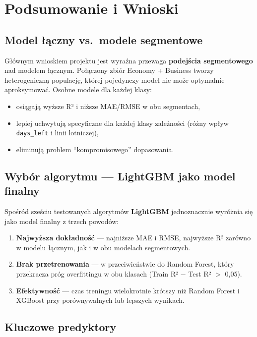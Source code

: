 \documentclass[12pt,a4paper]{article}
\begin{document}
	\section{Podsumowanie i Wnioski}
	
	\subsection{Model łączny vs.\ modele segmentowe}
	
	Głównym wnioskiem projektu jest wyraźna przewaga \textbf{podejścia segmentowego}
	nad modelem łącznym. Połączony zbiór Economy + Business tworzy heterogeniczną
	populację, której pojedynczy model nie może optymalnie aproksymować. Osobne
	modele dla każdej klasy:
	
	\begin{itemize}
		\item osiągają wyższe R² i niższe MAE/RMSE w obu segmentach,
		\item lepiej uchwytują specyficzne dla każdej klasy zależności
		(różny wpływ \texttt{days\_left} i linii lotniczej),
		\item eliminują problem ``kompromisowego'' dopasowania.
	\end{itemize}
	
	\subsection{Wybór algorytmu --- LightGBM jako model finalny}
	
	Spośród sześciu testowanych algorytmów \textbf{LightGBM} jednoznacznie wyróżnia
	się jako model finalny z trzech powodów:
	
	\begin{enumerate}
		\item \textbf{Najwyższa dokładność} --- najniższe MAE i RMSE, najwyższe R²
		zarówno w modelu łącznym, jak i w obu modelach segmentowych.
		\item \textbf{Brak przetrenowania} --- w przeciwieństwie do Random Forest,
		który przekracza próg overfittingu w obu klasach (Train R² $-$ Test R² $>$ 0,05).
		\item \textbf{Efektywność} --- czas treningu wielokrotnie krótszy niż
		Random Forest i XGBoost przy porównywalnych lub lepszych wynikach.
	\end{enumerate}
	
	\subsection{Kluczowe predyktory}
	
\end{document}

